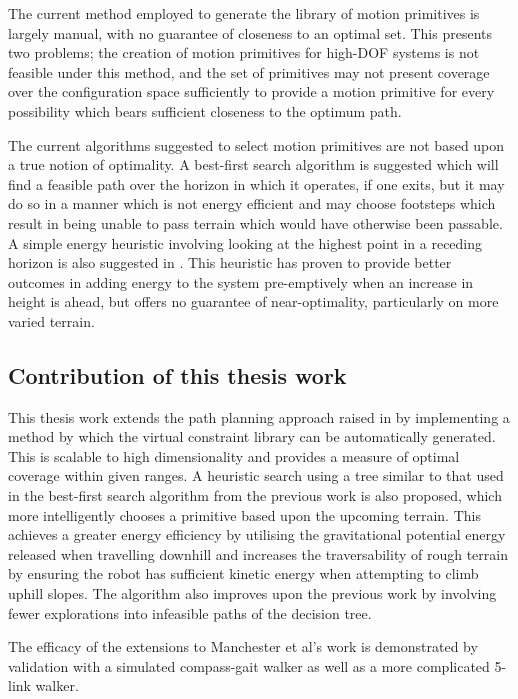 The current method employed to generate the library of motion primitives is largely manual, with no guarantee of closeness to an optimal set. This presents two problems; the creation of motion primitives for high-DOF systems is not feasible under this method, and the set of primitives may not present coverage over the configuration space sufficiently to provide a motion primitive for every possibility which bears sufficient closeness to the optimum path. 

The current algorithms suggested to select motion primitives are not based upon a true notion of optimality. A best-first search algorithm is suggested which will find a feasible path over the horizon in which it operates, if one exits, but it may do so in a manner which is not energy efficient and may choose footsteps which result in being unable to pass terrain which would have otherwise been passable. A simple energy heuristic involving looking at the highest point in a receding horizon is also suggested in \cite{manchester13planning}. This heuristic has proven to provide better outcomes in adding energy to the system pre-emptively when an increase in height is ahead, but offers no guarantee of near-optimality, particularly on more varied terrain. 

\subsection{Contribution of this thesis work}
This thesis work extends the path planning approach raised in \cite{manchester13planning} by implementing a method by which the virtual constraint library can be automatically generated. This is scalable to high dimensionality and provides a measure of optimal coverage within given ranges. A heuristic search using a tree similar to that used in the best-first search algorithm from the previous work is also proposed, which more intelligently chooses a primitive based upon the upcoming terrain. This achieves a greater energy efficiency by utilising the gravitational potential energy released when travelling downhill and increases the traversability of rough terrain by ensuring the robot has sufficient kinetic energy when attempting to climb uphill slopes. The algorithm also improves upon the previous work by involving fewer explorations into infeasible paths of the decision tree. 

The efficacy of the extensions to Manchester et al's work is demonstrated by validation with a simulated compass-gait walker as well as a more complicated 5-link walker.